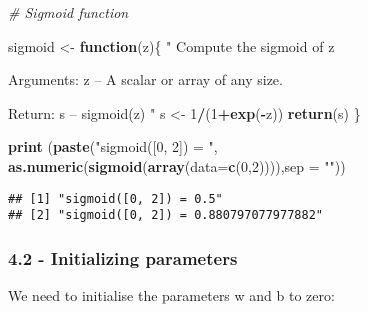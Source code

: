\documentclass[]{article}
\newenvironment{Shaded}{\begin{snugshade}}{\end{snugshade}}
\newcommand{\KeywordTok}[1]{\textcolor[rgb]{0.13,0.29,0.53}{\textbf{#1}}}
\newcommand{\DataTypeTok}[1]{\textcolor[rgb]{0.13,0.29,0.53}{#1}}
\newcommand{\DecValTok}[1]{\textcolor[rgb]{0.00,0.00,0.81}{#1}}
\newcommand{\StringTok}[1]{\textcolor[rgb]{0.31,0.60,0.02}{#1}}
\newcommand{\CommentTok}[1]{\textcolor[rgb]{0.56,0.35,0.01}{\textit{#1}}}
\newcommand{\ControlFlowTok}[1]{\textcolor[rgb]{0.13,0.29,0.53}{\textbf{#1}}}
\newcommand{\OperatorTok}[1]{\textcolor[rgb]{0.81,0.36,0.00}{\textbf{#1}}}
\newcommand{\NormalTok}[1]{#1}
\begin{document}
\begin{Shaded}
\begin{Highlighting}[]
\CommentTok{# Sigmoid function}

\NormalTok{sigmoid <-}\StringTok{ }\ControlFlowTok{function}\NormalTok{(z)\{}
  \StringTok{"}
\StringTok{    Compute the sigmoid of z}

\StringTok{    Arguments:}
\StringTok{    z -- A scalar or array of any size.}

\StringTok{    Return:}
\StringTok{    s -- sigmoid(z)}
\StringTok{    "}
\NormalTok{  s <-}\StringTok{ }\DecValTok{1}\OperatorTok{/}\NormalTok{(}\DecValTok{1}\OperatorTok{+}\KeywordTok{exp}\NormalTok{(}\OperatorTok{-}\NormalTok{z))}
  \KeywordTok{return}\NormalTok{(s)}
\NormalTok{\}}
\end{Highlighting}
\end{Shaded}

\begin{Shaded}
\begin{Highlighting}[]
\KeywordTok{print}\NormalTok{ (}\KeywordTok{paste}\NormalTok{(}\StringTok{"sigmoid([0, 2]) = "}\NormalTok{, }\KeywordTok{as.numeric}\NormalTok{(}\KeywordTok{sigmoid}\NormalTok{(}\KeywordTok{array}\NormalTok{(}\DataTypeTok{data=}\KeywordTok{c}\NormalTok{(}\DecValTok{0}\NormalTok{,}\DecValTok{2}\NormalTok{)))),}\DataTypeTok{sep =} \StringTok{""}\NormalTok{))}
\end{Highlighting}
\end{Shaded}

\begin{verbatim}
## [1] "sigmoid([0, 2]) = 0.5"              
## [2] "sigmoid([0, 2]) = 0.880797077977882"
\end{verbatim}

\subsubsection{4.2 - Initializing
parameters}\label{initializing-parameters}

We need to initialise the parameters w and b to zero:
\end{document}
